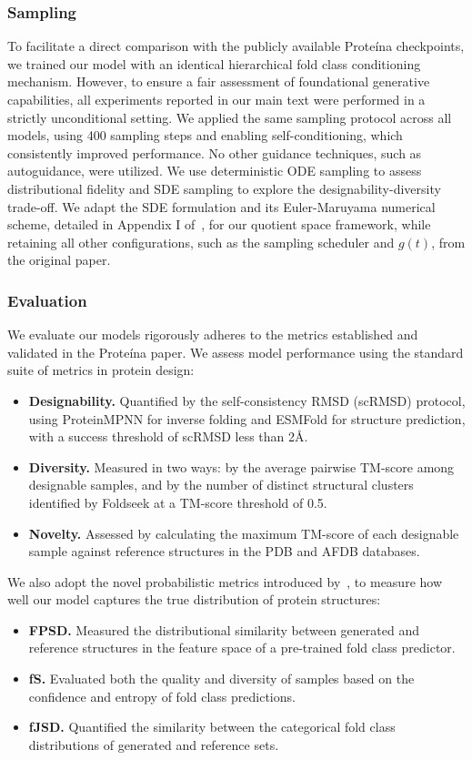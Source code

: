 \subsubsection{Sampling}
\label{appx:protein_sampling}
To facilitate a direct comparison with the publicly available Prote\'ina checkpoints, we trained our model with an identical hierarchical fold class conditioning mechanism. 
However, to ensure a fair assessment of foundational generative capabilities, all experiments reported in our main text were performed in a strictly unconditional setting.
We applied the same sampling protocol across all models, using 400 sampling steps and enabling self-conditioning, which consistently improved performance. 
No other guidance techniques, such as autoguidance, were utilized. 
We use deterministic ODE sampling to assess distributional fidelity and SDE sampling to explore the designability-diversity trade-off. 
We adapt the SDE formulation and its Euler-Maruyama numerical scheme, detailed in Appendix I of~\citep{geffner2025proteina}, for our quotient space framework, while retaining all other configurations, such as the sampling scheduler and $g(t)$, from the original paper.

\subsubsection{Evaluation}
\label{appx:protein_evaluation}
We evaluate our models rigorously adheres to the metrics established and validated in the Prote\'ina paper.
We assess model performance using the standard suite of metrics in protein design: 
\begin{itemize}
    \item \textbf{Designability.} Quantified by the self-consistency RMSD (scRMSD) protocol, using ProteinMPNN for inverse folding and ESMFold for structure prediction, with a success threshold of scRMSD less than 2\AA.
    \item \textbf{Diversity.} Measured in two ways: by the average pairwise TM-score among designable samples, and by the number of distinct structural clusters identified by Foldseek at a TM-score threshold of 0.5.
    \item \textbf{Novelty.} Assessed by calculating the maximum TM-score of each designable sample against reference structures in the PDB and AFDB databases.
\end{itemize}
We also  adopt the novel probabilistic metrics introduced by~\citep{geffner2025proteina}, to measure how well our model captures the true distribution of protein structures:
\begin{itemize}
    \item \textbf{FPSD.} Measured the distributional similarity between generated and reference structures in the feature space of a pre-trained fold class predictor.
    \item \textbf{fS.} Evaluated both the quality and diversity of samples based on the confidence and entropy of fold class predictions.
    \item \textbf{fJSD.} Quantified the similarity between the categorical fold class distributions of generated and reference sets.
\end{itemize}

